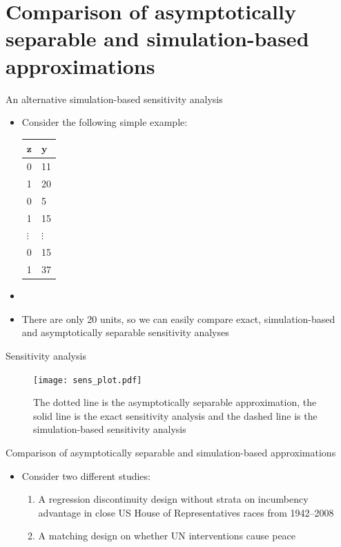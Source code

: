 \documentclass[table, xcolor={dvipsnames}, 9pt]{beamer}
\theoremstyle{newstyle}
\begin{document}
\section{Comparison of asymptotically separable and simulation-based approximations}
\begin{frame}{An alternative simulation-based sensitivity analysis}
\begin{itemize}
\item Consider the following simple example:
\begin{table}
\centering
    \begin{tabular}{l|l}
    $\mathbf{z}$ & $\mathbf{y}$ \\ \midrule
    0 & 11 \\
    1 & 20  \\
    0 & 5  \\
    1 & 15 \\
    $\vdots$ & $\vdots$ \\ 
    0 & 15  \\
    1 & 37 \\
    \end{tabular}
\end{table}
\item[]
\item \pause There are only 20 units, so we can easily compare exact, simulation-based and asymptotically separable sensitivity analyses
\end{itemize}
\end{frame}
\begin{frame}{Sensitivity analysis}
\begin{figure}
\texttt{[image: sens\_plot.pdf]}
\caption{The dotted line is the asymptotically separable approximation, the solid line is the exact sensitivity analysis and the dashed line is the simulation-based sensitivity analysis}
\end{figure}
\end{frame}
\begin{frame}{Comparison of asymptotically separable and simulation-based approximations}
\begin{itemize}
\item Consider two different studies:
\begin{enumerate}
\item \pause A regression discontinuity design without strata on incumbency advantage in close US House of Representatives races from 1942--2008 \citep{caugheysekhon2011}
\item \pause A matching design on whether UN interventions cause peace \citep{gilligansergenti2008}
\end{enumerate}	
\end{itemize}	
\end{frame}
\end{document}
